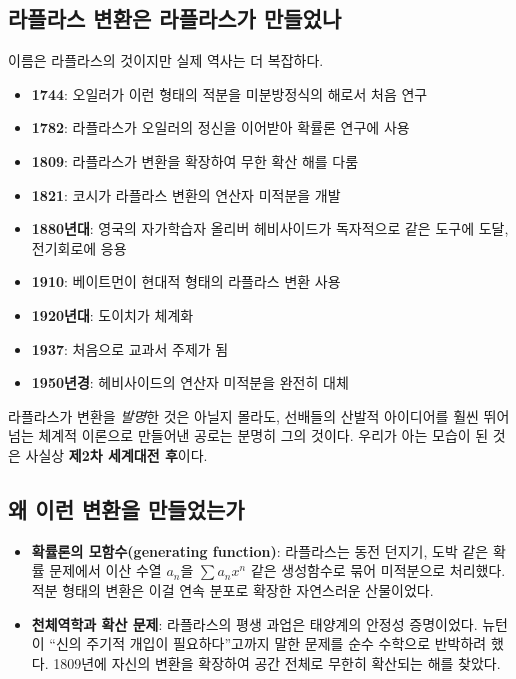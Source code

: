\documentclass[11pt,a4paper]{article}
\begin{document}
\subsection{라플라스 변환은 라플라스가 만들었나}

이름은 라플라스의 것이지만 실제 역사는 더 복잡하다.

\begin{historybox}[역사의 흐름]
\begin{itemize}
\item \textbf{1744}: 오일러가 이런 형태의 적분을 미분방정식의 해로서 처음 연구
\item \textbf{1782}: 라플라스가 오일러의 정신을 이어받아 확률론 연구에 사용
\item \textbf{1809}: 라플라스가 변환을 확장하여 무한 확산 해를 다룸
\item \textbf{1821}: 코시가 라플라스 변환의 연산자 미적분을 개발
\item \textbf{1880년대}: 영국의 자가학습자 올리버 헤비사이드가 독자적으로 같은 도구에 도달, 전기회로에 응용
\item \textbf{1910}: 베이트먼이 현대적 형태의 라플라스 변환 사용
\item \textbf{1920년대}: 도이치가 체계화
\item \textbf{1937}: 처음으로 교과서 주제가 됨
\item \textbf{1950년경}: 헤비사이드의 연산자 미적분을 완전히 대체
\end{itemize}
\end{historybox}

라플라스가 변환을 \emph{발명}한 것은 아닐지 몰라도, 선배들의 산발적 아이디어를 훨씬 뛰어넘는 체계적 이론으로 만들어낸 공로는 분명히 그의 것이다. 우리가 아는 모습이 된 것은 사실상 \textbf{제2차 세계대전 후}이다.

\subsection{왜 이런 변환을 만들었는가}

\begin{itemize}
\item \textbf{확률론의 모함수(generating function)}: 라플라스는 동전 던지기, 도박 같은 확률 문제에서 이산 수열 $a_n$을 $\sum a_n x^n$ 같은 생성함수로 묶어 미적분으로 처리했다. 적분 형태의 변환은 이걸 연속 분포로 확장한 자연스러운 산물이었다.
\item \textbf{천체역학과 확산 문제}: 라플라스의 평생 과업은 태양계의 안정성 증명이었다. 뉴턴이 ``신의 주기적 개입이 필요하다''고까지 말한 문제를 순수 수학으로 반박하려 했다. 1809년에 자신의 변환을 확장하여 공간 전체로 무한히 확산되는 해를 찾았다.
\end{itemize}
\end{document}
